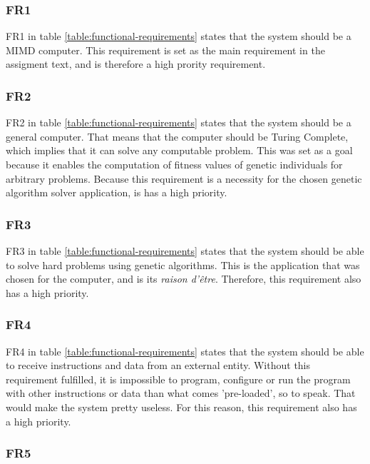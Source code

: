 \subsubsection{FR1}

FR1 in table \vref{table:functional-requirements} states that the system should be a MIMD computer.
This requirement is set as the main requirement in the assigment text, and is therefore a high prority requirement.

\subsubsection{FR2}

 FR2 in table \vref{table:functional-requirements} states that the system should be a general computer.
 That means that the computer should be Turing Complete, which implies that it can solve any computable problem.
 This was set as a goal because it enables the computation of fitness values of genetic individuals for arbitrary problems. 
 Because this requirement is a necessity for the chosen genetic algorithm solver application, is has a high priority.

\subsubsection{FR3}

FR3 in table \vref{table:functional-requirements} states that the system should be able to solve hard problems using genetic algorithms.
This is the application that was chosen for the computer, and is its \textit{raison d'être}.
Therefore, this requirement also has a high priority.

\subsubsection{FR4}

FR4 in table \vref{table:functional-requirements} states that the system should be able to receive instructions and data from an external entity.
Without this requirement fulfilled, it is impossible to program, configure or run the program with other instructions or data than what comes 'pre-loaded', so to speak.
That would make the system pretty useless.
For this reason, this requirement also has a high priority.

\subsubsection{FR5}

